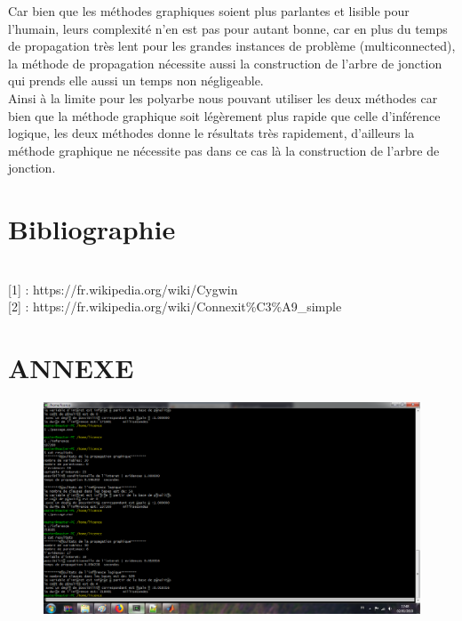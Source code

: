 \documentclass[12pt,a4paper,oneside]{book}
\begin{document}
    Car bien que les méthodes graphiques soient plus parlantes et lisible pour l'humain, leurs complexité n'en est pas pour autant bonne, car en plus du temps de propagation très lent pour les grandes instances de problème (multiconnected), la méthode de propagation nécessite aussi la construction de l'arbre de jonction qui prends elle aussi un temps non négligeable.\\
    
    Ainsi à la limite pour les polyarbe nous pouvant utiliser les deux méthodes car bien que la méthode graphique soit légèrement plus rapide que celle d'inférence logique, les deux méthodes donne le résultats très rapidement, d'ailleurs la méthode graphique ne nécessite pas dans ce cas là la construction de l'arbre de jonction.
      

\newpage
\chapter*{Bibliographie}
\textbf{ }\\

[1] : https://fr.wikipedia.org/wiki/Cygwin
\textbf{ }\\

[2] : https://fr.wikipedia.org/wiki/Connexit\%C3\%A9\_simple

\chapter*{ANNEXE}
\begin{figure}[H]
	\centering
	\includegraphics[scale=0.4]{screens/multiconnected.png}%
	\label{labelname}%
\end{figure}
\end{document}
